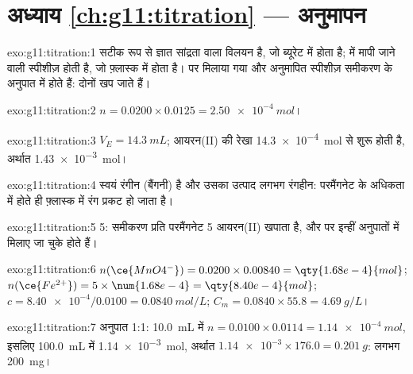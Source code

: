 \section*{अध्याय \ref{ch:g11:titration} --- अनुमापन}

\begin{solution}{exo:g11:titration:1}
 सटीक रूप से ज्ञात सांद्रता वाला विलयन है, जो ब्यूरेट में होता है;
 में मापी जाने वाली स्पीशीज़ होती है, जो फ़्लास्क में होता है।
 पर मिलाया गया  और अनुमापित स्पीशीज़
समीकरण के अनुपात में होते हैं: दोनों खप जाते हैं।
\end{solution}

\begin{solution}{exo:g11:titration:2}
$n = 0.0200 \times 0.0125 = \qty{2.50e-4}{mol}$।
\end{solution}

\begin{solution}{exo:g11:titration:3}
$V_E = \qty{14.3}{mL}$; आयरन(II) की रेखा
\qty{14.3e-4}{mol} से शुरू होती है, अर्थात \qty{1.43e-3}{mol}।
\end{solution}

\begin{solution}{exo:g11:titration:4}
 स्वयं रंगीन (बैंगनी) है और उसका उत्पाद लगभग
रंगहीन: परमैंगनेट के अधिकता में होते ही फ़्लास्क में रंग
प्रकट हो जाता है।
\end{solution}

\begin{solution}{exo:g11:titration:5}
5: समीकरण प्रति परमैंगनेट  5 आयरन(II)  खपाता है, और
 पर  इन्हीं अनुपातों में
मिलाए जा चुके होते हैं।
\end{solution}

\begin{solution}{exo:g11:titration:6}
$n(\ce{MnO4^-}) = 0.0200 \times 0.00840 = \qty{1.68e-4}{mol}$;
$n(\ce{Fe^{2+}}) = 5 \times \num{1.68e-4} = \qty{8.40e-4}{mol}$;
$c = \num{8.40e-4} / 0.0100 = \qty{0.0840}{mol/L}$;
$C_m = 0.0840 \times 55.8 = \qty{4.69}{g/L}$।
\end{solution}

\begin{solution}{exo:g11:titration:7}
अनुपात 1:1: \qty{10.0}{mL} में $n = 0.0100 \times 0.0114 = \qty{1.14e-4}{mol}$,
इसलिए \qty{100.0}{mL} में \qty{1.14e-3}{mol}, अर्थात
$\num{1.14e-3} \times 176.0 = \qty{0.201}{g}$: लगभग \qty{200}{mg}।
\end{solution}


